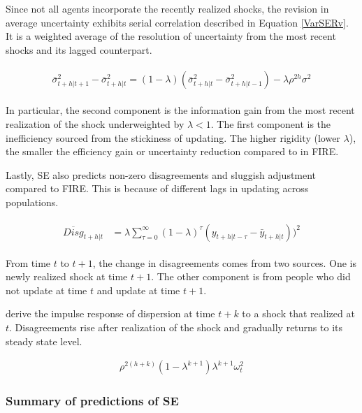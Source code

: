 \documentclass[]{article}
\begin{document}
	
	Since not all agents incorporate the recently realized shocks, the revision in average uncertainty exhibits serial correlation described in Equation \ref{VarSERv}. It is a weighted average of the resolution of uncertainty from the most recent shocks and its lagged counterpart. 
	
	\begin{eqnarray}\label{VarSERv}
		\begin{aligned}
			\bar \sigma^2_{t+h|t+1} - \bar \sigma^2_{t+h|t} = (1-\lambda)(
			\bar \sigma^2_{t+h|t} - \bar \sigma^2_{t+h|t-1}) -\lambda \rho^{2h} \sigma^2 
		\end{aligned}
	\end{eqnarray}
	
	In particular, the second component is the information gain from the most recent realization of the shock underweighted by $\lambda<1$. The first component is the inefficiency sourced from the stickiness of updating. The higher rigidity (lower $\lambda$), the smaller the efficiency gain or uncertainty reduction compared to in FIRE. 
	
	Lastly, SE also predicts non-zero disagreements and sluggish adjustment compared to FIRE. This is because of different lags in updating across populations. 
	
	\begin{eqnarray}\label{DisgSEPop}
		\begin{aligned}
			\overline{Disg}_{t+h|t} & = \lambda \sum^{\infty}_{\tau=0} (1-\lambda)^{\tau} (y_{t+h|t-\tau} - \bar y_{t+h|t }))^2  
		\end{aligned}
	\end{eqnarray}
	
	From time $t$ to $t+1$, the change in disagreements comes from two sources. One is newly realized shock at time $t+1$. The other component is from people who did not update at time $t$ and update at time $t+1$.  
	
	\citet{coibion2012can} derive the impulse response of dispersion at time $t+k$ to a shock that realized at $t$. Disagreements rise after realization of the shock and gradually returns to its steady state level.  
	
	\begin{eqnarray}
		\rho^{2(h+k)} (1-\lambda^{k+1})\lambda^{k+1} \omega^2_t
	\end{eqnarray}
	
	
	
	\subsubsection{Summary of predictions of SE}
	
\end{document}
